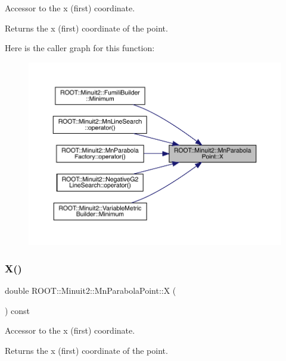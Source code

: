 Accessor to the x (first) coordinate.

\begin{DoxyReturn}{Returns}
the x (first) coordinate of the point. 
\end{DoxyReturn}
Here is the caller graph for this function\+:\nopagebreak
\begin{figure}[H]
\begin{center}
\leavevmode
\includegraphics[width=350pt]{de/de5/classROOT_1_1Minuit2_1_1MnParabolaPoint_afdb080f9186b5fa6966a42394f2a0678_icgraph}
\end{center}
\end{figure}
\mbox{\label{classROOT_1_1Minuit2_1_1MnParabolaPoint_afdb080f9186b5fa6966a42394f2a0678}} 
\subsubsection{\texorpdfstring{X()}{X()}\hspace{0.1cm}{\footnotesize\ttfamily [2/2]}}
{\footnotesize\ttfamily double R\+O\+O\+T\+::\+Minuit2\+::\+Mn\+Parabola\+Point\+::X (\begin{DoxyParamCaption}{ }\end{DoxyParamCaption}) const\hspace{0.3cm}{\ttfamily [inline]}}

Accessor to the x (first) coordinate.

\begin{DoxyReturn}{Returns}
the x (first) coordinate of the point. 
\end{DoxyReturn}
\mbox{\label{classROOT_1_1Minuit2_1_1MnParabolaPoint_abc0c0fa35bdee10c52229aadef4e20be}} 
